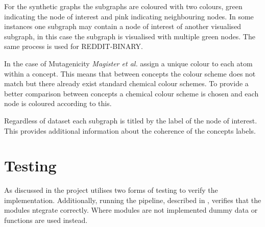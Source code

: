 For the synthetic graphs the subgraphs are coloured with two colours, green indicating the node of interest and pink indicating neighbouring nodes.
In some instances one subgraph may contain a node of interest of another visualised subgraph, in this case the subgraph is visualised with multiple green nodes.
The same process is used for REDDIT-BINARY\cite{Morris+2020}.

In the case of Mutagenicity\cite{Morris+2020} \textit{Magister et al.}\cite{magister2021gcexplainer} assign a unique colour to each atom within a concept.
This means that between concepts the colour scheme does not match but there already exist standard chemical colour schemes.
To provide a better comparison between concepts a chemical colour scheme is chosen and each node is coloured according to this.

Regardless of dataset each subgraph is titled by the label of the node of interest.
This provides additional information about the coherence of the concepts labels.

\section{Testing}
\label{sec:testing-imp}
As discussed in  the project utilises two forms of testing to verify the implementation.
Additionally, running the pipeline, described in , verifies that the modules ntegrate correctly.
Where modules are not implemented dummy data or functions are used instead.

